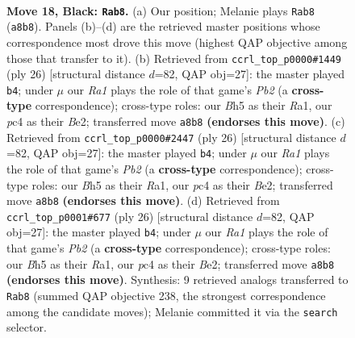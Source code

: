 \documentclass[11pt]{article}
\begin{document}
\clearpage

\begin{figure}[p]\centering
\begin{subfigure}{0.46\textwidth}\centering
\resizebox{\linewidth}{!}{%
\newchessgame
\chessboard[
  setfen={r1r3k1/1Np1bppp/p2p1nn1/7b/2P1PP2/PB6/6P1/RNB1R1K1 b - - 0 18},
  showmover=false,
  pgfstyle=straightmove, color=movearrow, markmove={a8-b8}
]}
\caption{}
\end{subfigure}\hfill
\begin{subfigure}{0.46\textwidth}\centering
\resizebox{\linewidth}{!}{%
\newchessgame
\chessboard[
  setfen={r1bb1rk1/pp3ppp/5n2/2n1p3/8/P1N1PN2/1P2BPPP/R1B2RK1 w - - 0 14},
  showmover=false,
  pgfstyle=straightmove, color=movearrow, markmove={b2-b4}
]}
\caption{}
\end{subfigure}
\\[4pt]
\begin{subfigure}{0.46\textwidth}\centering
\resizebox{\linewidth}{!}{%
\newchessgame
\chessboard[
  setfen={r1bb1rk1/pp3ppp/5n2/2n1p3/8/P1N1PN2/1P2BPPP/R1B2RK1 w - - 0 14},
  showmover=false,
  pgfstyle=straightmove, color=movearrow, markmove={b2-b4}
]}
\caption{}
\end{subfigure}\hfill
\begin{subfigure}{0.46\textwidth}\centering
\resizebox{\linewidth}{!}{%
\newchessgame
\chessboard[
  setfen={r1bb1rk1/pp3ppp/5n2/2n1p3/8/P1N1PN2/1P2BPPP/R1B2RK1 w - - 0 14},
  showmover=false,
  pgfstyle=straightmove, color=movearrow, markmove={b2-b4}
]}
\caption{}
\end{subfigure}
\caption{\textbf{Move 18, Black: \texttt{Rab8}.} (a) Our position; Melanie plays \texttt{Rab8} (\texttt{a8b8}). Panels (b)--(d) are the retrieved master positions whose correspondence most drove this move (highest QAP objective among those that transfer to it). (b) Retrieved from \texttt{ccrl\_top\_p0000\#1449} (ply 26) [structural distance $d$=82, QAP obj=27]: the master played \texttt{b4}; under $\mu$ our \emph{Ra1} plays the role of that game's \emph{Pb2} (a \textbf{cross-type} correspondence); cross-type roles: our \emph{B}h5 as their \emph{R}a1, our \emph{p}c4 as their \emph{B}e2; transferred move \texttt{a8b8} \textbf{(endorses this move)}. (c) Retrieved from \texttt{ccrl\_top\_p0000\#2447} (ply 26) [structural distance $d$=82, QAP obj=27]: the master played \texttt{b4}; under $\mu$ our \emph{Ra1} plays the role of that game's \emph{Pb2} (a \textbf{cross-type} correspondence); cross-type roles: our \emph{B}h5 as their \emph{R}a1, our \emph{p}c4 as their \emph{B}e2; transferred move \texttt{a8b8} \textbf{(endorses this move)}. (d) Retrieved from \texttt{ccrl\_top\_p0001\#677} (ply 26) [structural distance $d$=82, QAP obj=27]: the master played \texttt{b4}; under $\mu$ our \emph{Ra1} plays the role of that game's \emph{Pb2} (a \textbf{cross-type} correspondence); cross-type roles: our \emph{B}h5 as their \emph{R}a1, our \emph{p}c4 as their \emph{B}e2; transferred move \texttt{a8b8} \textbf{(endorses this move)}. Synthesis: 9 retrieved analogs transferred to \texttt{Rab8} (summed QAP objective 238, the strongest correspondence among the candidate moves); Melanie committed it via the \texttt{search} selector.}
\label{fig:thought-m35}
\end{figure}
\end{document}
